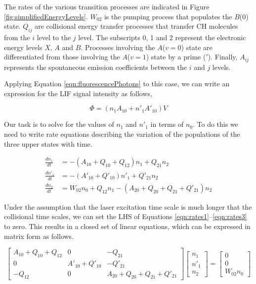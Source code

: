 The rates of the various transition processes are indicated in Figure \ref{fig:simplifiedEnergyLevels}.
\(W_{02}\) is the pumping process that populates the \(B\)(0) state.
\(Q_{ij}\) are collisional energy transfer processes that transfer CH molecules from the \(i\) level to the \(j\) level.
The subscripts 0, 1 and 2 represent the electronic energy levels \(X\), \(A\) and \(B\).
Processes involving the \(A\)(\(v=0\)) state are differentiated from those involving the \(A\)(\(v=1\)) state by a prime (\('\)).
Finally, \(A_{ij}\) represents the spontaneous emission coefficients between the \(i\) and \(j\) levels.

Applying Equation \ref{eqn:fluorescencePhotons} to this case, we can write an expression for the LIF signal intensity as follows,

\begin{equation}
  \Phi = ( n_1 A_{10} + n'_1 A'_{10} )V
  \label{eqn:signalIntensity}
\end{equation}

Our task is to solve for the values of \(n_1\) and \(n'_1\) in terms of \(n_0\).
To do this we need to write rate equations describing the variation of the populations of the three upper states with time.

\begin{align}
  \frac{dn_1}{dt} &= -( A_{10} + Q_{10} + Q_{12} )n_1 + Q_{21} n_2
  \label{eqn:rates1}\\
  \frac{dn'_1}{dt} &= -( A'_{10} + Q'_{10} )n'_1 + Q'_{21} n_2
  \label{eqn:rates2}\\
  \frac{dn_2}{dt} &= W_{02} n_0 + Q_{12} n_1 - ( A_{20} + Q_{20} + Q_{21} + Q'_{21} )n_2
  \label{eqn:rates3}
\end{align}

Under the assumption that the laser excitation time scale is much longer that the collisional time scales, we can set the LHS of Equations \ref{eqn:rates1}--\ref{eqn:rates3} to zero.
This results in a closed set of linear equations, which can be expressed in matrix form as follows.

\begin{equation}
  \left[
    \begin{matrix}
      A_{10} + Q_{10} + Q_{12} & 0 & -Q_{21}\\
      0 & A'_{10} + Q'_{10} & -Q'_{21}\\
      -Q_{12} & 0 & A_{20} + Q_{20} + Q_{21} + Q'_{21}
    \end{matrix}
  \right]\left[
    \begin{matrix}
      n_1\\
      n'_1\\
      n_2
    \end{matrix}
  \right] = \left[
    \begin{matrix}
      0\\
      0\\
      W_{02}n_0
    \end{matrix}
  \right]
  \label{eqn:closedForm}
\end{equation}

